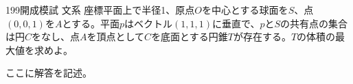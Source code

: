 \begin{thm}{199}{}{開成模試 文系}
 座標平面上で半径1、原点$O$を中心とする球面を$S$、点$(0,0,1)$を$A$とする。平面$p$はベクトル$(1,1,1)$に垂直で、$p$と$S$の共有点の集合は円$C$をなし、点$A$を頂点として$C$を底面とする円錐$T$が存在する。$T$の体積の最大値を求めよ。
\end{thm}

ここに解答を記述。